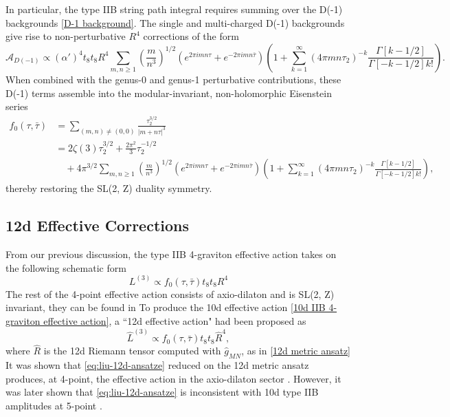 In particular, the type IIB string path integral requires summing over the D(-1) backgrounds \eqref{D-1 background}.
The single and multi-charged D(-1) backgrounds give rise to non-perturbative $R^4$ corrections \cite{Green:1997tv,Kehagias:1997cq} of the form
\begin{equation}
\mathcal A_{D(-1)}\propto (\alpha')^4t_8t_8R^4\sum_{m,n\ge1}\left(\frac{m}{n^3}\right)^{1/2}
(e^{2\pi i mn\tau}+e^{-2\pi i mn\bar{\tau}})
\left(
1+\sum_{k=1}^\infty(4\pi mn\tau_2)^{-k}\frac{\Gamma[k-1/2]}{\Gamma[-k-1/2]k!}
\right).
\end{equation}
When combined with the genus-0 and genus-1 perturbative contributions, these D(-1) terms assemble into the modular-invariant, non-holomorphic Eisenstein series
\begin{equation}
\begin{aligned}
f_0(\tau,\bar\tau)
&=\sum_{(m,n)\neq(0,0)}\frac{\tau_2^{3/2}}{|m+n\tau|^3}\\
&=2\zeta(3)\tau_2^{3/2}+\frac{2\pi^2}{3}\tau_2^{-1/2}\\
&\quad+4\pi^{3/2}\sum_{m,n\ge1}\left(\frac{m}{n^3}\right)^{1/2}
(e^{2\pi i mn\tau}+e^{-2\pi i mn\bar{\tau}})
\left(
1+\sum_{k=1}^\infty(4\pi mn\tau_2)^{-k}\frac{\Gamma[k-1/2]}{\Gamma[-k-1/2]k!}
\right),
\end{aligned}
\label{eq:f_0 Eisenstein}
\end{equation}
thereby restoring the SL(2, Z) duality symmetry.

\subsection{12d Effective Corrections}
\label{sec:12d effective corrections}
From our previous discussion, the type IIB 4-graviton effective action takes on the following schematic form \cite{Kehagias:1997cq,Green:1997tv}
\begin{equation}
L^{(3)} \propto f_0(\tau,\bar\tau)t_8t_8 R^4
\label{10d IIB 4-graviton effective action}
\end{equation}
The rest of the 4-point effective action consists of axio-dilaton and is SL(2, Z) invariant, they can be found in \cite{Policastro:2006vt,Policastro:2008hg}
To produce the 10d effective action \eqref{10d IIB 4-graviton effective action},
a ``12d effective action" had been proposed as \cite{Minasian:2015bxa} 
\begin{equation}
\hat{L}^{(3)} \propto f_0(\tau,\bar\tau)t_8t_8 \hat{R}^4,
\label{eq:liu-12d-ansatze}
\end{equation}
where $\hat{R}$ is the 12d Riemann tensor computed with $\hat{g}_{MN}$, as in \eqref{12d metric ansatz}
It was shown that \eqref{eq:liu-12d-ansatze} reduced on the 12d metric ansatz  produces, at 4-point, the effective action in the axio-dilaton sector \cite{Policastro:2006vt,Policastro:2008hg}.
However, it was later shown that \eqref{eq:liu-12d-ansatze} is inconsistent with 10d type IIB amplitudes at 5-point \cite{Liu:2025uqu}.

